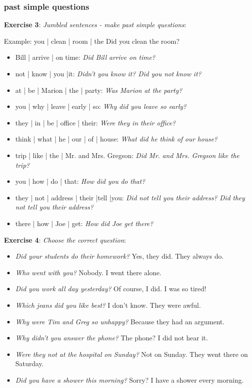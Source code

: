 \subsubsection{past simple questions}

\textbf{Exercise 3}: \textit{Jumbled sentences - make past simple questions}:

Example:
you | clean | room | the
Did you clean the room?

\begin{itemize}

\item Bill | arrive | on time: \textit{Did Bill arrive on time?}
\item not | know | you |it: \textit{Didn't you know it? Did you not know it?}
\item at | be | Marion | the | party: \textit{Was Marion at the party?}
\item you | why | leave | early | so: \textit{Why did you leave so early?}
\item they | in | be | office | their: \textit{Were they in their office?}
\item think | what | he | our | of | house: \textit{What did he think of our house?} 
\item trip | like | the | Mr. and Mrs. Gregson: \textit{Did Mr. and Mrs. Gregson like the trip?}
\item you | how | do | that: \textit{How did you do that?}
\item they | not | address | their |tell |you: \textit{Did not tell you their address? Did they not tell you their address?}
\item there | how | Joe | get: \textit{How did Joe get there?}

\end{itemize}

\textbf{Exercise 4}: \textit{Choose the correct question}:

\begin{itemize}

\item \textit{Did your students do their homework?} Yes, they did. They always do.
\item \textit{Who went with you?} Nobody. I went there alone.
\item \textit{Did you work all day yesterday?} Of course, I did. I was so tired!
\item \textit{Which jeans did you like best?} I don't know. They were awful.
\item \textit{Why were Tim and Greg so unhappy?} Because they had an argument.
\item \textit{Why didn't you answer the phone?} The phone? I did not hear it.
\item \textit{Were they not at the hospital on Sunday?} Not on Sunday. They went there on Saturday.
\item \textit{Did you have a shower this morning?} Sorry? I have a shower every morning.

\end{itemize}

